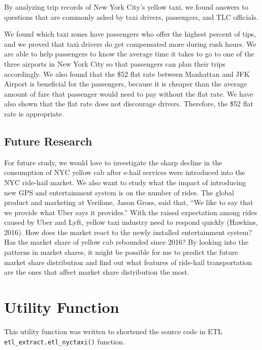 \documentclass[12pt,twoside]{reedthesis}
\newenvironment{Shaded}{\begin{snugshade}}{\end{snugshade}}
\newcommand{\KeywordTok}[1]{\textcolor[rgb]{0.13,0.29,0.53}{\textbf{#1}}}
\newcommand{\DataTypeTok}[1]{\textcolor[rgb]{0.13,0.29,0.53}{#1}}
\newcommand{\StringTok}[1]{\textcolor[rgb]{0.31,0.60,0.02}{#1}}
\newcommand{\ControlFlowTok}[1]{\textcolor[rgb]{0.13,0.29,0.53}{\textbf{#1}}}
\newcommand{\OperatorTok}[1]{\textcolor[rgb]{0.81,0.36,0.00}{\textbf{#1}}}
\newcommand{\NormalTok}[1]{#1}
\theoremstyle{definition}
\theoremstyle{definition}
\theoremstyle{definition}
\theoremstyle{remark}
\begin{document}
By analyzing trip records of New York City's yellow taxi, we found
answers to questions that are commonly asked by taxi drivers,
passengers, and TLC officials.

We found which taxi zones have passengers who offer the highest percent
of tips, and we proved that taxi drivers do get compensated more during
rush hours. We are able to help passengers to know the average time it
takes to go to one of the three airports in New York City so that
passengers can plan their trips accordingly. We also found that the \$52
flat rate between Manhattan and JFK Airport is beneficial for the
passengers, because it is cheaper than the average amount of fare that
passenger would need to pay without the flat rate. We have also shown
that the flat rate does not discourage drivers. Therefore, the \$52 flat
rate is appropriate.

\section{Future Research}\label{future-research}

For future study, we would love to investigate the sharp decline in the
consumption of NYC yellow cab after e-hail services were introduced into
the NYC ride-hail market. We also want to study what the impact of
introducing new GPS and entertainment system is on the number of rides.
The global product and marketing at Verifone, Jason Gross, said that,
``We like to say that we provide what Uber says it provides.'' With the
raised expectation among rides caused by Uber and Lyft, yellow taxi
industry need to respond quickly (Hawkins, 2016). How does the market
react to the newly installed entertainment system? Has the market share
of yellow cab rebounded since 2016? By looking into the patterns in
market shares, it might be possible for me to predict the future market
share distribution and find out what features of ride-hail
transportation are the ones that affect market share distribution the
most.

\appendix

\chapter{Utility Function}\label{utility-function}

This utility function was written to shortened the source code in ETL
\texttt{etl\_extract.etl\_nyctaxi()} function.
\begin{Shaded}
\end{Shaded}
\end{document}
